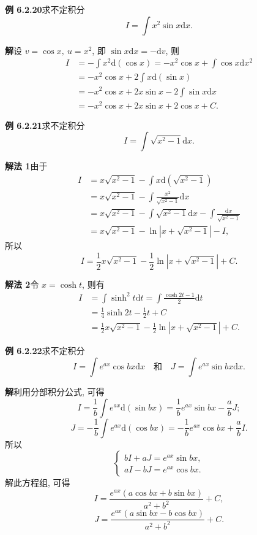 \documentclass[UTF8, 12pt, fontset=fandol, oneside]{ctexart}
\begin{document}
\noindent\textbf{例 6.2.20}\quad 求不定积分
\[
  I=\int x^2\sin x\mathrm dx.
\]

\noindent\textbf{解}\quad 设 $v=\cos x,\ u=x^2$, 即 $\sin x\mathrm dx=-\mathrm dv$, 则
\[
\begin{aligned}
  I
  &=
  -\int x^2\mathrm d(\cos x)
  =
  -x^2\cos x+\int\cos x\mathrm d x^2\\
  &=
  -x^2\cos x+2\int x\mathrm d(\sin x)\\
  &=
  -x^2\cos x+2x\sin x-2\int\sin x\mathrm dx\\
  &=
  -x^2\cos x+2x\sin x+2\cos x+C.
\end{aligned}
\]

\noindent\textbf{例 6.2.21}\quad 求不定积分
\[
  I=\int\sqrt{x^2-1}\mathrm dx.
\]

\noindent\textbf{解法 1}\quad 由于
\[
\begin{aligned}
  I
  &=
  x\sqrt{x^2-1}-\int x\mathrm d(\sqrt{x^2-1})\\
  &=
  x\sqrt{x^2-1}-\int\frac{x^2}{\sqrt{x^2-1}}\mathrm dx\\
  &=
  x\sqrt{x^2-1}-\int\sqrt{x^2-1}\mathrm dx-\int\frac{\mathrm dx}{\sqrt{x^2-1}}\\
  &=
  x\sqrt{x^2-1}-\ln|x+\sqrt{x^2-1}|-I,
\end{aligned}
\]
所以
\[
  I=\frac12x\sqrt{x^2-1}-\frac12\ln|x+\sqrt{x^2-1}|+C.
\]

\noindent\textbf{解法 2}\quad 令 $x=\cosh t$, 则有
\[
\begin{aligned}
  I
  &=
  \int\sinh^2t\mathrm dt
  =
  \int\frac{\cosh2t-1}{2}\mathrm dt\\
  &=
  \frac14\sinh2t-\frac12t+C\\
  &=
  \frac12x\sqrt{x^2-1}-\frac12\ln|x+\sqrt{x^2-1}|+C.
\end{aligned}
\]

\noindent\textbf{例 6.2.22}\quad 求不定积分
\[
  I=\int e^{ax}\cos bx\mathrm dx
  \quad\text{和}\quad
  J=\int e^{ax}\sin bx\mathrm dx.
\]

\noindent\textbf{解}\quad 利用分部积分公式, 可得
\[
  I=\frac1b\int e^{ax}\mathrm d(\sin bx)
  =
  \frac1be^{ax}\sin bx-\frac abJ;
\]
\[
  J=-\frac1b\int e^{ax}\mathrm d(\cos bx)
  =
  -\frac1be^{ax}\cos bx+\frac abI.
\]
所以
\[
  \begin{cases}
    bI+aJ=e^{ax}\sin bx,\\
    aI-bJ=e^{ax}\cos bx.
  \end{cases}
\]
解此方程组, 可得
\[
  I=\frac{e^{ax}(a\cos bx+b\sin bx)}{a^2+b^2}+C,
\]
\[
  J=\frac{e^{ax}(a\sin bx-b\cos bx)}{a^2+b^2}+C.
\]
\end{document}
